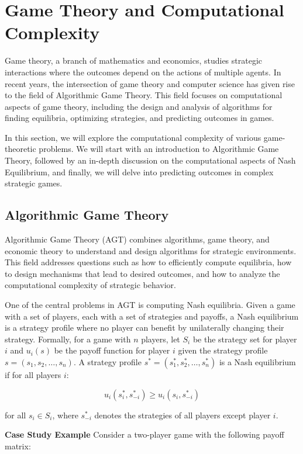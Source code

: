 \documentclass[12pt]{book} %
\begin{document}
\section{Game Theory and Computational Complexity}
Game theory, a branch of mathematics and economics, studies strategic interactions where the outcomes depend on the actions of multiple agents. In recent years, the intersection of game theory and computer science has given rise to the field of Algorithmic Game Theory. This field focuses on computational aspects of game theory, including the design and analysis of algorithms for finding equilibria, optimizing strategies, and predicting outcomes in games.

In this section, we will explore the computational complexity of various game-theoretic problems. We will start with an introduction to Algorithmic Game Theory, followed by an in-depth discussion on the computational aspects of Nash Equilibrium, and finally, we will delve into predicting outcomes in complex strategic games.

\subsection{Algorithmic Game Theory}
Algorithmic Game Theory (AGT) combines algorithms, game theory, and economic theory to understand and design algorithms for strategic environments. This field addresses questions such as how to efficiently compute equilibria, how to design mechanisms that lead to desired outcomes, and how to analyze the computational complexity of strategic behavior.

One of the central problems in AGT is computing Nash equilibria. Given a game with a set of players, each with a set of strategies and payoffs, a Nash equilibrium is a strategy profile where no player can benefit by unilaterally changing their strategy. Formally, for a game with $n$ players, let $S_i$ be the strategy set for player $i$ and $u_i(s)$ be the payoff function for player $i$ given the strategy profile $s = (s_1, s_2, \ldots, s_n)$. A strategy profile $s^* = (s_1^*, s_2^*, \ldots, s_n^*)$ is a Nash equilibrium if for all players $i$:

\[
u_i(s_i^*, s_{-i}^*) \geq u_i(s_i, s_{-i}^*)
\]

for all $s_i \in S_i$, where $s_{-i}^*$ denotes the strategies of all players except player $i$.

\textbf{Case Study Example}
Consider a two-player game with the following payoff matrix:
\end{document}
